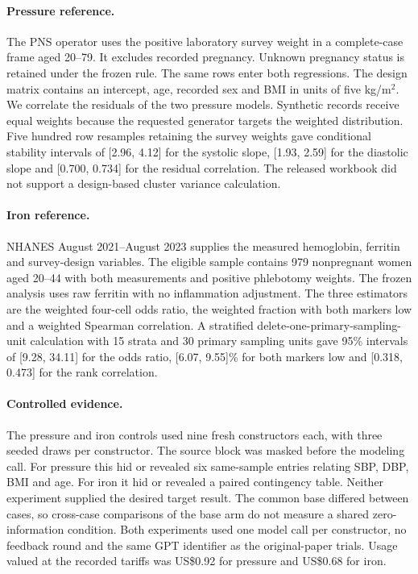 \paragraph{Pressure reference.}
The PNS operator uses the positive laboratory survey weight in a complete-case frame aged 20--79. It excludes recorded pregnancy. Unknown pregnancy status is retained under the frozen rule. The same rows enter both regressions. The design matrix contains an intercept, age, recorded sex and BMI in units of five kg/m$^2$. We correlate the residuals of the two pressure models. Synthetic records receive equal weights because the requested generator targets the weighted distribution. Five hundred row resamples retaining the survey weights gave conditional stability intervals of [2.96, 4.12] for the systolic slope, [1.93, 2.59] for the diastolic slope and [0.700, 0.734] for the residual correlation. The released workbook did not support a design-based cluster variance calculation.

\paragraph{Iron reference.}
NHANES August 2021--August 2023 supplies the measured hemoglobin, ferritin and survey-design variables. The eligible sample contains 979 nonpregnant women aged 20--44 with both measurements and positive phlebotomy weights. The frozen analysis uses raw ferritin with no inflammation adjustment. The three estimators are the weighted four-cell odds ratio, the weighted fraction with both markers low and a weighted Spearman correlation. A stratified delete-one-primary-sampling-unit calculation with 15 strata and 30 primary sampling units gave 95\% intervals of [9.28, 34.11] for the odds ratio, [6.07, 9.55]\% for both markers low and [0.318, 0.473] for the rank correlation.

\paragraph{Controlled evidence.}
The pressure and iron controls used nine fresh constructors each, with three seeded draws per constructor. The source block was masked before the modeling call. For pressure this hid or revealed six same-sample entries relating SBP, DBP, BMI and age. For iron it hid or revealed a paired contingency table. Neither experiment supplied the desired target result. The common base differed between cases, so cross-case comparisons of the base arm do not measure a shared zero-information condition. Both experiments used one model call per constructor, no feedback round and the same GPT identifier as the original-paper trials. Usage valued at the recorded tariffs was US\$0.92 for pressure and US\$0.68 for iron.


